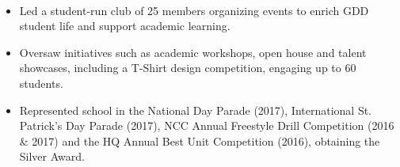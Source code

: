 \documentclass[a4paper,10pt]{article}
\begin{document}
\begin{center}
\begin{minipage}{1\textwidth}
      \normalsize\noindent{}\\[-0.25cm]
      \makebox[\linewidth]{\rule{1.02\linewidth}{0.3pt}}

      \noindent
      \hfill
      \hfill

      \vspace{0.15cm}

      \begin{itemize}[left=0pt, labelsep=0.5em, itemsep=0pt, topsep=0pt, parsep=0pt, partopsep=0pt]
        \item \small\lato Led a student-run club of 25 members organizing events to enrich GDD student life and support academic learning.      
        \item \small\lato Oversaw initiatives such as academic workshops, open house and talent showcases, including a T-Shirt design competition, engaging up to 60 students.
      \end{itemize}

      \vspace{0.25cm}

      \noindent
      \hfill
      \hfill

      \vspace{0.15cm}

      \begin{itemize}[left=0pt, labelsep=0.5em, itemsep=0pt, topsep=0pt, parsep=0pt, partopsep=0pt]
        \item \small\lato Represented school in the National Day Parade (2017), International St. Patrick's Day Parade (2017), NCC Annual Freestyle Drill Competition (2016 \& 2017) and the HQ Annual Best Unit Competition (2016), obtaining the Silver Award.
      \end{itemize}
      
      \vspace{0.25cm}

      \noindent
      \hfill
      \hfill


\end{minipage}
\end{center}
\end{document}

